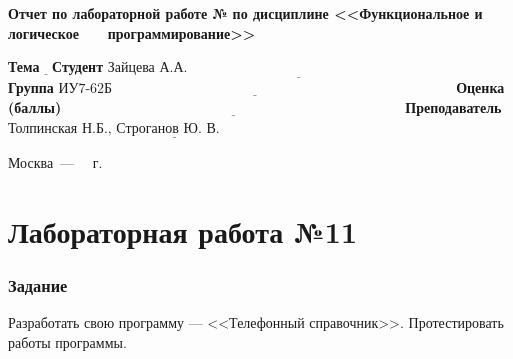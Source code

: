 \documentclass[12pt]{report}
\begin{document}
\begin{titlepage}
		\begin{center}
			\noindent\begin{minipage}{1.1\textwidth}\centering
				\Large\textbf{  Отчет по лабораторной работе №}\newline
				\textbf{по дисциплине <<Функциональное и логическое}\newline
				\textbf{~~~программирование>>}\newline\newline
			\end{minipage}
		\end{center}
		
		\noindent\textbf{Тема} $\underline{\text{}}$\newline\newline
		\noindent\textbf{Студент} $\underline{\text{Зайцева А.А.~~~~~~~~~~~~~~~~~~~~~~~~~~~~~~~~~~~~~~~~~~~~~~~~~~~~~~~~~~~~~~~~~}}$\newline\newline
		\noindent\textbf{Группа} $\underline{\text{ИУ7-62Б~~~~~~~~~~~~~~~~~~~~~~~~~~~~~~~~~~~~~~~~~~~~~~~~~~~~~~~~~~~~~~~~~~~~~~~~~}}$\newline\newline
		\noindent\textbf{Оценка (баллы)} $\underline{\text{~~~~~~~~~~~~~~~~~~~~~~~~~~~~~~~~~~~~~~~~~~~~~~~~~~~~~~~~~~~~~~~~~~~~~~~~}}$\newline\newline
		\noindent\textbf{Преподаватель} $\underline{\text{Толпинская Н.Б., Строганов Ю. В.~~~~~~~~~~~~~~~~~~~~~~~~~~}}$\newline\newline\newline
		
		\begin{center}
			\vfill
			Москва~---~\the\year
			~г.
		\end{center}
	\end{titlepage}
	

\chapter*{Лабораторная работа №11}
\subsection*{Задание}
Разработать свою программу — <<Телефонный справочник>>. Протестировать работы программы.
\end{document}
